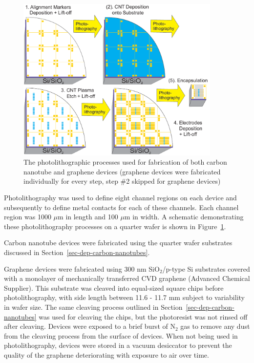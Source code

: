 \documentclass[
  a4paper,
]{scrbook}
\begin{document}
\begin{figure}

{\centering \includegraphics[width=0.9\textwidth,height=\textheight]{./figures/ch4/photolithography-cycle.png}

}

\caption{\label{fig-qw-photolithography}The photolithographic processes
used for fabrication of both carbon nanotube and graphene devices
(graphene devices were fabricated individually for every step, step \#2
skipped for graphene devices)}

\end{figure}

Photolithography was used to define eight channel regions on each device
and subsequently to define metal contacts for each of these channels.
Each channel region was 1000 \(\mu\)m in length and 100 \(\mu\)m in
width. A schematic demonstrating these photolithography processes on a
quarter wafer is shown in Figure~\ref{fig-qw-photolithography}.

Carbon nanotube devices were fabricated using the quarter wafer
substrates discussed in Section~\ref{sec-dep-carbon-nanotubes}.

Graphene devices were fabricated using 300 nm SiO\(_2\)/p-type Si
substrates covered with a monolayer of mechanically transferred CVD
graphene (Advanced Chemical Supplier). This substrate was cleaved into
equal-sized square chips before photolithography, with side length
between 11.6 - 11.7 mm subject to variability in wafer size. The same
cleaving process outlined in Section~\ref{sec-dep-carbon-nanotubes} was
used for cleaving the chips, but the photoresist was not rinsed off
after cleaving. Devices were exposed to a brief burst of N\(_2\) gas to
remove any dust from the cleaving process from the surface of devices.
When not being used in photolithography, devices were stored in a vacuum
desiccator to prevent the quality of the graphene deteriorating with
exposure to air over time.
\end{document}
